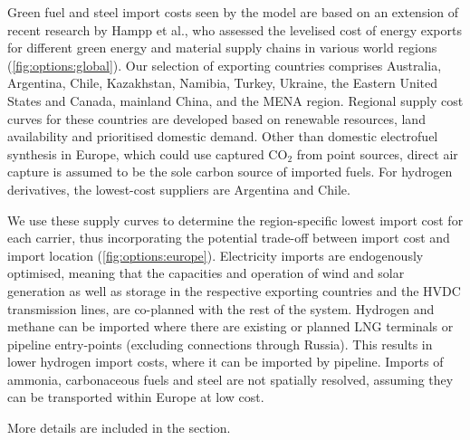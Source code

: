 Green fuel and steel import costs seen by the model are based on an extension of
recent research by Hampp et al.,\cite{hamppImportOptions2023} who assessed the
levelised cost of energy exports for different green energy and material supply
chains in various world regions (\cref{fig:options:global}). Our selection of
exporting countries comprises Australia, Argentina, Chile, Kazakhstan, Namibia,
Turkey, Ukraine, the Eastern United States and Canada, mainland China, and the
MENA region. Regional supply cost curves for these countries are developed based
on renewable resources, land availability and prioritised domestic demand. Other
than domestic electrofuel synthesis in Europe, which could use captured CO$_2$
from point sources, direct air capture is assumed to be the sole carbon source
of imported fuels. For hydrogen derivatives, the lowest-cost suppliers are
Argentina and Chile.

We use these supply curves to determine the region-specific lowest import cost
for each carrier, thus incorporating the potential trade-off between import cost
and import location (\cref{fig:options:europe}). Electricity imports are
endogenously optimised, meaning that the capacities and operation of wind and
solar generation as well as storage in the respective exporting countries and
the HVDC transmission lines, are co-planned with the rest of the system.
Hydrogen and methane can be imported where there are existing or planned LNG
terminals or pipeline entry-points (excluding connections through Russia). This
results in lower hydrogen import costs, where it can be imported by pipeline.
Imports of ammonia, carbonaceous fuels and steel are not spatially resolved,
assuming they can be transported within Europe at low cost. 

More details are included in the  section.







